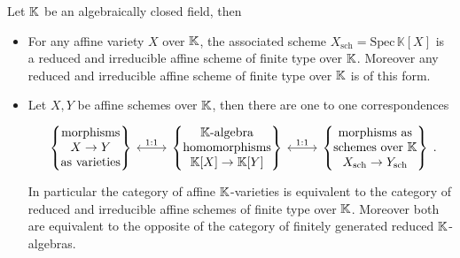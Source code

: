 \begin{prop}
	Let $\mathbb{K}$ be an algebraically closed field, then
	\begin{itemize}
		\item For any affine variety $X$ over $\mathbb{K}$,
			the associated scheme $X_{\text{sch}} = \mathrm{Spec}\, \mathbb{K}[X]$
			is a reduced and irreducible affine scheme
			of finite type over $\mathbb{K}$.
			Moreover any reduced and irreducible affine scheme of finite type over
			$\mathbb{K}$ is of this form.
		\item Let $X,Y$ be affine schemes over $\mathbb{K}$, then there
			are one to one correspondences
			\begin{equation*}
			\begin{tikzcd}
				\left\{ 
				\begin{matrix}
					\text{morphisms}\\
					X \to Y\\
					\text{as varieties}
				\end{matrix} 
				\right\} \arrow[r, "1:1", leftrightarrow] &
				\left\{ 
				\begin{matrix}
					\K\text{-algebra}\\
					\text{homomorphisms}\\
					\mathbb{K}[X] \to \K[Y]
				\end{matrix} 
				\right\} \arrow[r, "1:1", leftrightarrow] &
				\left\{ 
				\begin{matrix}
					\text{morphisms as}\\
					\text{schemes over }\K\\
					X_{\text{sch}} \to Y_{\text{sch}}\\
				\end{matrix} 
				\right\} 
			\end{tikzcd}
			.\end{equation*} 
		In particular the category of affine $\mathbb{K}$-varieties is equivalent to
		the category of reduced and irreducible affine schemes of
		finite type over $\mathbb{K}$.
		Moreover both are equivalent to the opposite of the category of finitely 
		generated reduced $\mathbb{K}$-algebras.
	\end{itemize}
\end{prop} 

